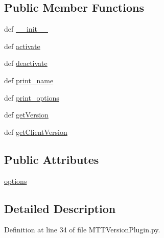 \subsection*{Public Member Functions}
\begin{DoxyCompactItemize}
\item 
def \hyperlink{class_m_t_t_version_plugin_1_1_m_t_t_version_plugin_ac0154c5878b4d9428f25bd81041a7001}{\-\_\-\-\_\-init\-\_\-\-\_\-}
\item 
def \hyperlink{class_m_t_t_version_plugin_1_1_m_t_t_version_plugin_a226b355e9ac12c9ff72acdb0caed743f}{activate}
\item 
def \hyperlink{class_m_t_t_version_plugin_1_1_m_t_t_version_plugin_a8b2f6a214a6b2aa86edb153ef202cae2}{deactivate}
\item 
def \hyperlink{class_m_t_t_version_plugin_1_1_m_t_t_version_plugin_a99e7df2f04fea79f772d940de9bb734e}{print\-\_\-name}
\item 
def \hyperlink{class_m_t_t_version_plugin_1_1_m_t_t_version_plugin_af46b74be44c27d532b1d542c8fafef8e}{print\-\_\-options}
\item 
def \hyperlink{class_m_t_t_version_plugin_1_1_m_t_t_version_plugin_ad1be874bcc65f8cf6262403e414ce8e8}{get\-Version}
\item 
def \hyperlink{class_m_t_t_version_plugin_1_1_m_t_t_version_plugin_a8352904d6605d8c47b3c98b92a304ec7}{get\-Client\-Version}
\end{DoxyCompactItemize}
\subsection*{Public Attributes}
\begin{DoxyCompactItemize}
\item 
\hyperlink{class_m_t_t_version_plugin_1_1_m_t_t_version_plugin_a95c4231c332e3aa0af05703aa9858c8c}{options}
\end{DoxyCompactItemize}


\subsection{Detailed Description}


Definition at line 34 of file M\-T\-T\-Version\-Plugin.\-py.



